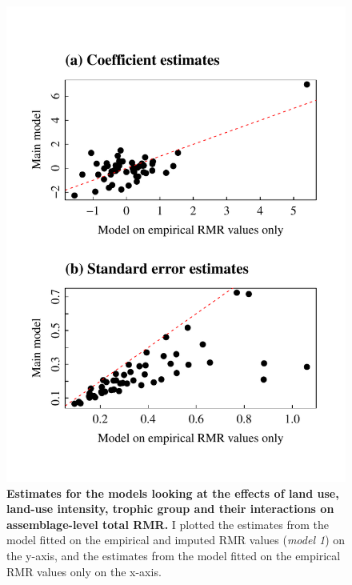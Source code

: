 \begin{figure}[h!]
\centering
\includegraphics[scale=0.7]{Supporting/Chapter5/Figures/tRMR_coefs_complete_VS_imputed}
\caption[Estimates for the models looking at the effects of land use, land-use intensity, trophic group and their interactions on assemblage-level total RMR]{\textbf{Estimates for the models looking at the effects of land use, land-use intensity, trophic group and their interactions on assemblage-level total RMR.} I plotted the estimates from the model fitted on the empirical and imputed RMR values (\textit{model 1}) on the y-axis, and the estimates from the model fitted on the empirical RMR values only on the x-axis.}
\label{SI5_figure4}
\end{figure}


